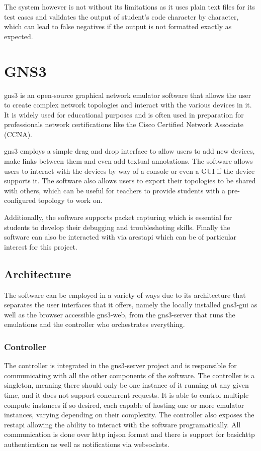 The system however is not without its limitations as it uses plain text files for its test cases and validates the output 
of student's code character by character, which can lead to false negatives if the output is not formatted exactly as
expected.

\section{GNS3}
\ac{gns3} is an open-source graphical network emulator software that allows the user to create complex network topologies and interact with 
the various devices in it. It is widely used for educational purposes and is often used in preparation for professionals 
network certifications like the Cisco Certified Network Associate (CCNA).

\ac{gns3} employs a simple drag and drop interface to allow users to add new devices, make links between them 
and even add textual annotations. The software allows users to interact with the devices by way of a console or even a GUI
if the device supports it. The software also allows users to export their topologies to be shared with others, which can
be useful for teachers to provide students with a pre-configured topology to work on.

Additionally, the software supports packet capturing which is essential for students to develop their debugging and 
troubleshoting skills. Finally the software can also be interacted with via a\ac{rest}\ac{api} which can be of particular interest
for this project.

\subsection{Architecture}
The software can be employed in a variety of ways due to its architecture \cite{GNS3Architecture} that separates the user interfaces that it offers,
namely the locally installed gns3-gui as well as the browser accessible gns3-web, from the gns3-server that runs the emulations
and the controller who orchestrates everything. 

\subsubsection{Controller}
The controller is integrated in the gns3-server project and is responsible for communicating with all the other components 
of the software. The controller is a singleton, meaning there should only be one instance of it running at any given time, 
and it does not support concurrent requests. It is able to control multiple compute instances if so desired, each capable 
of hosting one or more emulator instances, varying depending on their complexity. The controller also exposes the 
\ac{rest}\ac{api} allowing the ability to interact with the software programatically. All communication is done over
\ac{http} in\ac{json} format and there is support for basic\ac{http} authentication as well as notifications via websockets.

